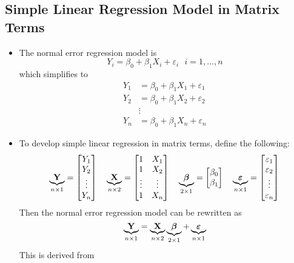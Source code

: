 \subsection{Simple Linear Regression Model in Matrix Terms}
\begin{itemize} 
\item The normal error regression model is $$ Y_i = \beta_0 + \beta_1X_i + \varepsilon_i ~~~ i = 1,\dots,n $$ which simplifies to $$ \begin{aligned} Y_1 &= \beta_0 + \beta_1X_1 + \varepsilon_1 \\ Y_2 &= \beta_0 + \beta_1X_2 + \varepsilon_2 \\ &\vdots \\ Y_n &= \beta_0 + \beta_1X_n + \varepsilon_n \end{aligned} $$ 
\item To develop simple linear regression in matrix terms, define the following: $$ \underbrace{\mtx{Y}}_{n \times 1} = \matrix{Y_1 \\ Y_2 \\ \vdots \\ Y_n} ~~~ \underbrace{\mtx{X}}_{n \times 2} = \matrix{ 1 & X_1 \\ 1 & X_2 \\ \vdots & \vdots \\ 1 & X_n} ~~~ \underbrace{\bm{\beta}}_{2 \times 1} = \matrix{\beta_0 \\ \beta_1} ~~~ \underbrace{\bm{\varepsilon}}_{n \times 1} = \matrix{\varepsilon_1 \\ \varepsilon_2 \\ \vdots \\ \varepsilon_n} $$ Then the normal error regression model can be rewritten as $$ \underbrace{\mtx{Y}}_{n \times 1} = \underbrace{\mtx{X}}_{n \times 2} \underbrace{\bm{\beta}}_{2 \times 1} + \underbrace{\bm{\varepsilon}}_{n \times 1} $$ This is derived from 
$$ \begin{aligned} 

\end{aligned}$$
\end{itemize}
